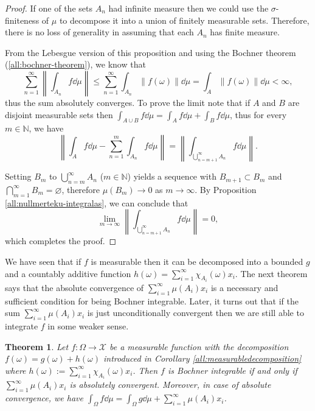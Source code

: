 \documentclass[a4paper, 12pt]{article}
\newtheorem{theo}[lem]{Theorem}
\begin{document}
\begin{proof}
If one of the sets  $A_n$ had infinite measure then we could use the $\sigma$-finiteness of $\mu$ to decompose it into a union of finitely measurable sets. Therefore, there is no loss of generality in assuming that each $A_n$ has finite measure.

From the Lebesgue version of this proposition and using the Bochner theorem (\ref{all:bochner-theorem}), we know that
$$
\sum\limits^{\infty}_{n=1} \left \|  \int_{A_n} f \dd{\mu} \right\| \leqslant \sum\limits^{\infty}_{n=1} \int_{A_n} \| f(\omega) \| \dd{\mu} = \int_{A} \| f(\omega) \| \dd{\mu} < \infty,
$$
thus the sum absolutely converges. To prove the limit note that if $A$ and $B$ are disjoint measurable sets then $\int_{A \cup B} f \dd{\mu} = \int_{A} f \dd{\mu} + \int_{B} f \dd{\mu}$, thus for every $m \in \mathbb{N}$, we have
$$\left\| \int_{A} f \dd{\mu} - \sum^{m}_{n=1} \int_{A_n} f \dd{\mu} \right\| = \left \| \int_{\bigcup\limits^{\infty}_{n=m+1} A_n} f \dd{\mu} \right \|.$$

Setting $B_{m}$ to $\bigcup^{\infty}_{n=m} A_n$ ($m \in \mathbb{N}$) yields a sequence with $B_{m+1} \subset B_{m}$ and $\bigcap^{\infty}_{m = 1} B_m = \varnothing$, therefore $\mu(B_m) \to 0$ as $m \to \infty$. By Proposition \ref{all:nullmerteku-integralas}, we can conclude that
$$
\lim_{m \to \infty} \left \| \int_{\bigcup\limits^{\infty}_{n=m+1} A_n} f \dd{\mu} \right \| = 0,
$$
which completes the proof.
\end{proof}
We have seen that if $f$ is measurable then it can be decomposed into a bounded $g$ and a countably additive function $h(\omega) = \sum^{\infty}_{i=1} \chi_{A_i}(\omega) x_i$. The next theorem says that the absolute convergence of $\sum^{\infty}_{i=1} \mu(A_i) x_i$ is a necessary and sufficient condition for being Bochner integrable. Later, it turns out that if the sum $\sum^{\infty}_{i=1} \mu(A_i)x_i$ is just unconditionally convergent then we are still able to integrate $f$ in some weaker sense.
\begin{theo}\label{all:integrable-absolutely-convergent} Let $f \colon \Omega \to \mathcal{X}$ be a measurable function with the decomposition $f(\omega)=g(\omega)+h(\omega)$ introduced in Corollary \ref{all:measurabledecomposition} where $h(\omega) := \sum^{\infty}_{i=1} \chi_{A_i}(\omega) x_i$. Then $f$ is Bochner integrable if and only if $\sum^{\infty}_{i=1}\mu(A_i) x_i$ is absolutely convergent. Moreover, in case of absolute convergence, we have $\int_{\Omega} f \dd{\mu} = \int_{\Omega} g \dd{\mu} + \sum^{\infty}_{i=1}\mu(A_i) x_i$.
\end{theo}
\end{document}
